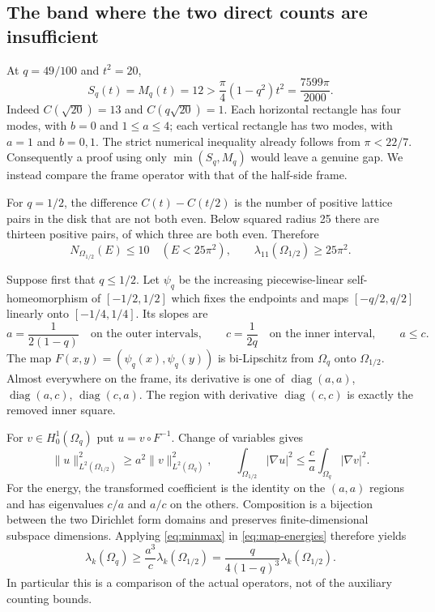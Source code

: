 \documentclass[11pt,reqno]{amsart}
\numberwithin{equation}{section}
\newcommand{\abs}[1]{\lvert#1\rvert}
\newcommand{\norm}[1]{\lVert#1\rVert}
\newcommand{\Om}{\Omega}
\begin{document}
\subsection*{The band where the two direct counts are insufficient}

At $q=49/100$ and $t^2=20$,
\begin{equation}\label{eq:true-count-failure}
 S_q(t)=M_q(t)=12>
 \frac\pi4(1-q^2)t^2=\frac{7599\pi}{2000}.
\end{equation}
Indeed $C(\sqrt{20})=13$ and $C(q\sqrt{20})=1$.
Each horizontal rectangle has four modes, with $b=0$ and
$1\le a\le4$; each vertical rectangle has two modes,
with $a=1$ and $b=0,1$. The strict numerical inequality
already follows from $\pi<22/7$.
Consequently a proof using only $\min(S_q,M_q)$ would leave
a genuine gap. We instead compare the frame operator with
that of the half-side frame.

For $q=1/2$, the difference $C(t)-C(t/2)$ is the number of
positive lattice pairs in the disk that are not both even.
Below squared radius 25 there are thirteen positive pairs,
of which three are both even. Therefore
\begin{equation}\label{eq:half-gap}
 N_{\Om_{1/2}}(E)\le10\quad(E<25\pi^2),
 \qquad\lambda_{11}(\Om_{1/2})\ge25\pi^2.
\end{equation}

Suppose first that $q\le1/2$. Let $\psi_q$ be the increasing
piecewise-linear self-homeomorphism of $[-1/2,1/2]$ which
fixes the endpoints and maps $[-q/2,q/2]$ linearly onto
$[-1/4,1/4]$. Its slopes are
\begin{equation}\label{eq:map-slopes}
 a=\frac1{2(1-q)}\quad\text{on the outer intervals},
 \qquad c=\frac1{2q}\quad\text{on the inner interval},
 \qquad a\le c.
\end{equation}
The map $F(x,y)=(\psi_q(x),\psi_q(y))$ is bi-Lipschitz from
$\Om_q$ onto $\Om_{1/2}$. Almost everywhere on the frame,
its derivative is one of
$\operatorname{diag}(a,a)$,
$\operatorname{diag}(a,c)$,
$\operatorname{diag}(c,a)$.
The region with derivative $\operatorname{diag}(c,c)$ is
exactly the removed inner square.

For $v\in H^1_0(\Om_q)$ put $u=v\circ F^{-1}$.
Change of variables gives
\begin{equation}\label{eq:map-energies}
 \norm u_{L^2(\Om_{1/2})}^2\ge a^2\norm v_{L^2(\Om_q)}^2,
 \qquad
 \int_{\Om_{1/2}}\abs{\nabla u}^2
 \le\frac ca\int_{\Om_q}\abs{\nabla v}^2.
\end{equation}
For the energy, the transformed coefficient is the identity
on the $(a,a)$ regions and has eigenvalues $c/a$ and $a/c$
on the others. Composition is a bijection between the two
Dirichlet form domains and preserves finite-dimensional
subspace dimensions. Applying \eqref{eq:minmax} in
\eqref{eq:map-energies} therefore yields
\begin{equation}\label{eq:transfer}
 \lambda_k(\Om_q)\ge\frac{a^3}{c}\lambda_k(\Om_{1/2})
 =\frac{q}{4(1-q)^3}\lambda_k(\Om_{1/2}).
\end{equation}
In particular this is a comparison of the actual operators,
not of the auxiliary counting bounds.
\end{document}
